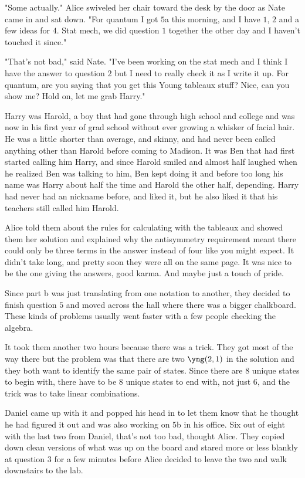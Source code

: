 "Some actually." Alice swiveled her chair toward the desk by the door as Nate came in and sat down. "For quantum I got $5$a this morning, and I have $1$, $2$ and a few ideas for $4$. Stat mech, we did question $1$ together the other day and I haven't touched it since." 

"That's not bad," said Nate. "I've been working on the stat mech and I think I have the answer to question $2$ but I need to really check it as I write it up. For quantum, are you saying that you get this Young tableaux stuff? Nice, can you show me? Hold on, let me grab Harry." 

Harry was Harold, a boy that had gone through high school and college and was now in his first year of grad school without ever growing a whisker of facial hair. He was a little shorter than average, and skinny, and had never been called anything other than Harold before coming to Madison. It was Ben that had first started calling him Harry, and since Harold smiled and almost half laughed when he realized Ben was talking to him, Ben kept doing it and before too long his name was Harry about half the time and Harold the other half, depending. Harry had never had an nickname before, and liked it, but he also liked it that his teachers still called him Harold. 

\mypause

Alice told them about the rules for calculating with the tableaux and showed them her solution and explained why the antisymmetry requirement meant there could only be three terms in the answer instead of four like you might expect. It didn't take long, and pretty soon they were all on the same page. It was nice to be the one giving the answers, good karma. And maybe just a touch of pride.

Since part b was just translating from one notation to another, they decided to finish question $5$ and moved across the hall where there was a bigger chalkboard. These kinds of problems usually went faster with a few people checking the algebra. 

It took them another two hours because there was a trick. They got most of the way there but the problem was that there are two $\yng(2,1)$ in the solution and they both want to identify the same pair of states. Since there are 8 unique states to begin with, there have to be 8 unique states to end with, not just 6, and the trick was to take linear combinations.

Daniel came up with it and popped his head in to let them know that he thought he had figured it out and was also working on $5$b in his office. Six out of eight with the last two from Daniel, that's not too bad, thought Alice. They copied down clean versions of what was up on the board and stared more or less blankly at question 3 for a few minutes before Alice decided to leave the two and walk downstairs to the lab. 

